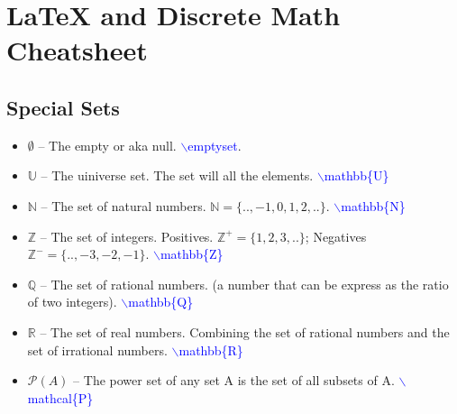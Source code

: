 \documentclass[12pt]{article}
\begin{document}
\section*{LaTeX and Discrete Math Cheatsheet}

\subsection*{Special Sets}

\begin{itemize}
    \item $\emptyset$ -- The empty or aka null. \textcolor{blue} {$\backslash$emptyset}.
    \item $\mathbb{U}$ -- The uiniverse set. The set will all the elements. \textcolor{blue} {$\backslash$mathbb\{U\}}
    \item $\mathbb{N}$ -- The set of natural numbers. $\mathbb{N}=\{..,-1,0,1,2,..\}$. \textcolor{blue} {$\backslash$mathbb\{N\}}
    \item $\mathbb{Z}$ -- The set of integers. Positives. $\mathbb{Z}^+=\{1, 2, 3,..\}$; Negatives $\mathbb{Z}^-=\{..,-3, -2, -1\}$. \textcolor{blue} {$\backslash$mathbb\{Z\}}
    \item $\mathbb{Q}$ -- The set of rational numbers. (a number that can be express as the ratio of two integers). \textcolor{blue} {$\backslash$mathbb\{Q\}}
    \item $\mathbb{R}$ -- The set of real numbers. Combining the set of rational numbers and the set of irrational numbers. \textcolor{blue} {$\backslash$mathbb\{R\}}
    \item $\mathcal{P} (A)$ -- The power set of any set A is the set of all subsets of A. \textcolor{blue} {$\backslash$mathcal\{P\}}
\end{itemize}
\end{document}
